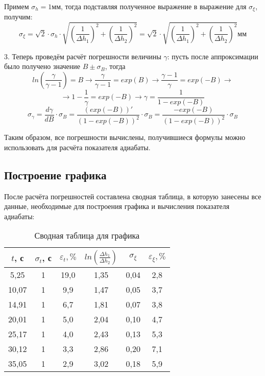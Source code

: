 \documentclass[a4paper,14pt]{article}
\begin{document}
Примем $\sigma_h = 1$мм, тогда подставляя полученное выражение в выражение для $\sigma_{\xi}$, получим:
\begin{equation}
\sigma_{\xi} = \sqrt{2} \cdot \sigma_h \cdot \sqrt{\left(\frac{1}{\Delta h_1}\right)^2 + \left(\frac{1}{\Delta h_2}\right)^2} = \sqrt{2} \cdot \sqrt{\left(\frac{1}{\Delta h_1}\right)^2 + \left(\frac{1}{\Delta h_2}\right)^2} \text{мм}
\end{equation}

3. Теперь проведём расчёт погрешности величины $\gamma$: пусть после аппроксимации было получено значение $B \pm \sigma_B$, тогда  \begin{equation}
ln\left(\frac{\gamma}{\gamma - 1}\right) = B \rightarrow \frac{\gamma}{\gamma - 1} = exp(B) 
\rightarrow \frac{\gamma - 1}{\gamma} = exp(-B) \rightarrow \end{equation} 
\begin{equation}
\rightarrow 1 - \frac{1}{\gamma} = exp(-B) \rightarrow \gamma = \frac{1}{1 - exp (-B)}
\end{equation}
\begin{equation}
\sigma_{\gamma} = \frac{d\gamma}{dB} \cdot \sigma_{B} = \frac{(exp(-B))'}{(1 - exp(-B))^2} \cdot \sigma_{B} = \frac{-exp(-B)}{(1-exp(-B))^2} \cdot \sigma_{B}
\end{equation}

Таким образом, все погрешности вычислены, получившиеся формулы можно использовать для расчёта показателя адиабаты.

\subsection{Построение графика}
После расчёта погрешностей составлена сводная таблица, в которую занесены все данные, необходимые для построения графика и вычисления показателя адиабаты: \newpage

\begin{table}[h!]
\caption{Сводная таблица для графика}
\label{   }
\begin{tabular}{|c|c|c|c|c|c|}
\hline
$t$, с  & $\sigma_t$, с & $\varepsilon_t, \%$  & $ln\left(\frac{\Delta h_1}{\Delta h_2}\right)$ & $\sigma_{\xi}$ & $\varepsilon_{\xi}, \% $  \\ \hline
5,25  & 1      & 19,0   & 1,35       & 0,04     & 2,8     \\ \hline
10,07 & 1       & 9,9    & 1,47       & 0,05     & 3,7     \\ \hline
14,91 & 1       & 6,7    & 1,81       & 0,07     & 3,8     \\ \hline
20,01 & 1       & 5,0    & 2,04       & 0,10     & 4,7     \\ \hline
25,17 & 1       & 4,0    & 2,43       & 0,13     & 5,3     \\ \hline
30,12 & 1       & 3,3    & 2,86       & 0,20     & 7,1     \\ \hline
35,05 & 1       & 2,9    & 3,02       & 0,18     & 5,9     \\ \hline
\end{tabular}
\end{table}
\end{document}
